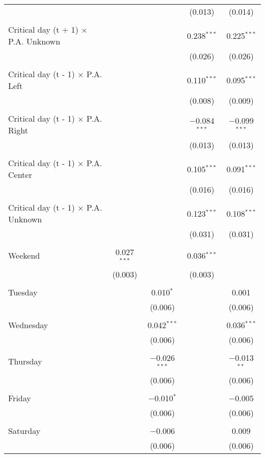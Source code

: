 \documentclass[
]{article}
\begin{document}
\begin{table}[!htbp]
{\begin{tabular}{@{\extracolsep{5pt}}lcccc}
  &  &  & (0.013) & (0.014) \\ 
  & & & & \\ 
 Critical day (t + 1) $\times$ P.A. Unknown &  &  & 0.238$^{***}$ & 0.225$^{***}$ \\ 
  &  &  & (0.026) & (0.026) \\ 
  & & & & \\ 
 Critical day (t - 1) $\times$ P.A. Left &  &  & 0.110$^{***}$ & 0.095$^{***}$ \\ 
  &  &  & (0.008) & (0.009) \\ 
  & & & & \\ 
 Critical day (t - 1) $\times$ P.A. Right &  &  & $-$0.084$^{***}$ & $-$0.099$^{***}$ \\ 
  &  &  & (0.013) & (0.013) \\ 
  & & & & \\ 
 Critical day (t - 1) $\times$ P.A. Center &  &  & 0.105$^{***}$ & 0.091$^{***}$ \\ 
  &  &  & (0.016) & (0.016) \\ 
  & & & & \\ 
 Critical day (t - 1) $\times$ P.A. Unknown &  &  & 0.123$^{***}$ & 0.108$^{***}$ \\ 
  &  &  & (0.031) & (0.031) \\ 
  & & & & \\ 
 Weekend & 0.027$^{***}$ &  & 0.036$^{***}$ &  \\ 
  & (0.003) &  & (0.003) &  \\ 
  & & & & \\ 
 Tuesday &  & 0.010$^{*}$ &  & 0.001 \\ 
  &  & (0.006) &  & (0.006) \\ 
  & & & & \\ 
 Wednesday &  & 0.042$^{***}$ &  & 0.036$^{***}$ \\ 
  &  & (0.006) &  & (0.006) \\ 
  & & & & \\ 
 Thursday &  & $-$0.026$^{***}$ &  & $-$0.013$^{**}$ \\ 
  &  & (0.006) &  & (0.006) \\ 
  & & & & \\ 
 Friday &  & $-$0.010$^{*}$ &  & $-$0.005 \\ 
  &  & (0.006) &  & (0.006) \\ 
  & & & & \\ 
 Saturday &  & $-$0.006 &  & 0.009 \\ 
  &  & (0.006) &  & (0.006) \\ 

\end{tabular}}
\end{table}
\end{document}
